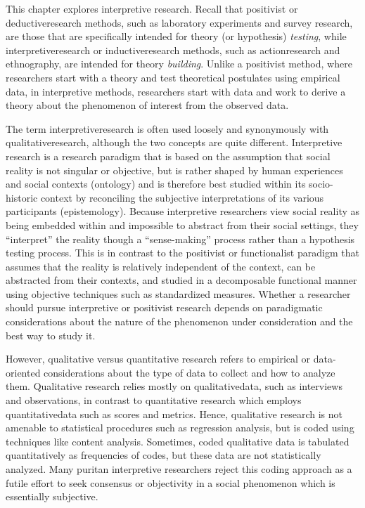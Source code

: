 This chapter explores interpretive research. Recall that \gls{positivist} or \gls{deductiveresearch} methods, such as laboratory experiments and survey research, are those that are specifically intended for \gls{theory} (or \gls{hypothesis}) \textit{testing}, while \gls{interpretiveresearch} or \gls{inductiveresearch} methods, such as \gls{actionresearch} and \gls{ethnography}, are intended for theory \textit{building}. Unlike a positivist method, where researchers start with a theory and test theoretical postulates using empirical data, in interpretive methods, researchers start with data and work to derive a theory about the phenomenon of interest from the observed data.

The term \gls{interpretiveresearch} is often used loosely and synonymously with \gls{qualitativeresearch}, although the two concepts are quite different. Interpretive research is a research paradigm that is based on the assumption that social reality is not singular or objective, but is rather shaped by human experiences and social contexts (\gls{ontology}) and is therefore best studied within its socio-historic context by reconciling the subjective interpretations of its various participants (\gls{epistemology}). Because interpretive researchers view social reality as being embedded within and impossible to abstract from their social settings, they ``interpret'' the reality though a ``sense-making'' process rather than a hypothesis testing process. This is in contrast to the positivist or functionalist paradigm that assumes that the reality is relatively independent of the context, can be abstracted from their contexts, and studied in a decomposable functional manner using objective techniques such as standardized measures. Whether a researcher should pursue interpretive or positivist research depends on paradigmatic considerations about the nature of the phenomenon under consideration and the best way to study it.

However, qualitative versus quantitative research refers to empirical or data-oriented considerations about the type of data to collect and how to analyze them. Qualitative research relies mostly on \gls{qualitativedata}, such as interviews and observations, in contrast to quantitative research which employs \gls{quantitativedata} such as scores and metrics. Hence, qualitative research is not amenable to statistical procedures such as regression analysis, but is coded using techniques like content analysis. Sometimes, coded qualitative data is tabulated quantitatively as frequencies of codes, but these data are not statistically analyzed. Many puritan interpretive researchers reject this coding approach as a futile effort to seek consensus or objectivity in a social phenomenon which is essentially subjective.

